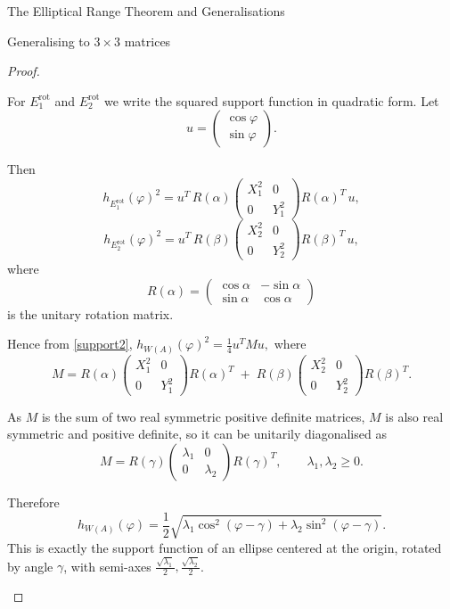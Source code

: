 \documentclass[12pt]{article}
\theoremstyle{plain}
\theoremstyle{definition}
\theoremstyle{remark}
\renewcommand{\phi}{\varphi}
\numberwithin{equation}{section}
\begin{document}
\begin{section}{The Elliptical Range Theorem and Generalisations}
\begin{subsection}{Generalising to $3 \times 3$ matrices}
\begin{proof}
\begin{enumerate}
For $E_1^{\mathrm{rot}}$ and $E_2^{\mathrm{rot}}$ we write the squared support function in quadratic form.  
Let 
\[
u = \begin{pmatrix} \cos\phi \\  \sin\phi \end{pmatrix}.
\]

Then
\[
h_{E_1^{\mathrm{rot}}}(\phi)^2 
= u^T \, R(\alpha)
\begin{pmatrix} X_1^2 & 0 \\  0 & Y_1^2 \end{pmatrix}
R(\alpha)^T \, u,
\]
\[
h_{E_2^{\mathrm{rot}}}(\phi)^2 
= u^T \, R(\beta)
\begin{pmatrix} X_2^2 & 0 \\  0 & Y_2^2 \end{pmatrix}
R(\beta)^T \, u,
\]
where \[
R(\alpha) =
\begin{pmatrix}
\cos\alpha & -\sin\alpha \\
\sin\alpha & \cos\alpha
\end{pmatrix}
\]
is the unitary rotation matrix.


Hence from \eqref{support2}, $h_{W(A)}(\phi)^2 = \frac{1}{4}u^T M u,$ where
\begin{equation}\label{M}
    M = R(\alpha)\begin{pmatrix}X_1^2&0\\0&Y_1^2\end{pmatrix}R(\alpha)^T
\;+\;R(\beta)\begin{pmatrix}X_2^2&0\\0&Y_2^2\end{pmatrix}R(\beta)^T.
\end{equation}


As $M$ is the sum of two real symmetric positive definite matrices, $M$ is also real symmetric and positive definite, so it can be unitarily diagonalised as
\[
M = R(\gamma)
\begin{pmatrix}\lambda_1 & 0 \\  0 & \lambda_2\end{pmatrix}
R(\gamma)^T, \qquad \lambda_1,\lambda_2 \geq 0.
\]

Therefore
\[
h_{W(A)}(\phi) =\frac{1}{2} \sqrt{\lambda_1 \cos^2(\phi-\gamma) + \lambda_2 \sin^2(\phi-\gamma)}.
\]
This is exactly the support function of an ellipse centered at the origin, rotated by angle $\gamma$, with semi-axes $\frac{\sqrt{\lambda_1}}{2}, \frac{\sqrt{\lambda_2}}{2}$.  



\end{enumerate}
\end{proof}
\end{subsection}
\end{section}
\end{document}
